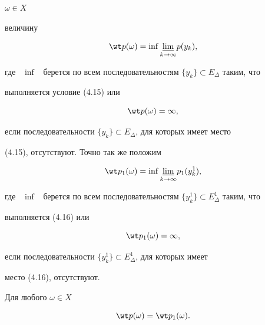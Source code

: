$\omega\in X$ 


величину 


\begin{equation} 


\wt p(\omega)=\inf\underset{k\to\infty}{\varliminf}{}p(y_k), 


\end{equation} 


где \ $\inf$ \ берется по всем последовательностям $\{y_k\}\subset 


E_\Delta$ таким, что 


выполняется условие (4.15) или 


\begin{equation} 


\wt p(\omega)=\infty, 


\end{equation} 


если последовательности $\{y_k\}\subset E_\Delta$, для которых имеет место 


(4.15), отсутствуют. Точно так же положим 


\begin{equation} 


\wt p_1(\omega)=\inf\underset{k\to\infty}{\varliminf}{} 


p_1(y^1_k), 


\end{equation} 


где \ $\inf$ \ берется по всем последовательностям $\{y^1_k\}\subset 


E^1_\Delta$ таким, что 


выполняется (4.16) или 


\begin{equation} 


\wt p_1(\omega)=\infty, 


\end{equation} 


если последовательности $\{y^1_k\}\subset E^1_\Delta$, для которых имеет 


место (4.16), отсутствуют. 


 


\begin{props} 


Для любого $\omega\in X$ 


\begin{equation} 


\wt p(\omega)=\wt p_1(\omega). 


\end{equation} 


\end{props} 


